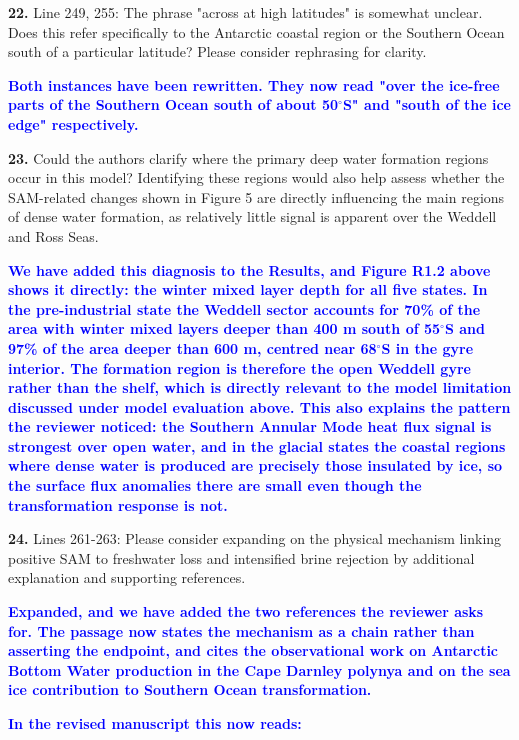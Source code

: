 \documentclass[pdflatex,sn-nature]{sn-jnl}
\begin{document}
\medskip
\noindent \textbf{22.} Line 249, 255: The phrase "across at high latitudes" is somewhat unclear. Does this refer specifically to the Antarctic coastal region or the Southern Ocean south of a particular latitude? Please consider rephrasing for clarity.
\medskip

\noindent\textcolor{blue}{\textbf{Both instances have been rewritten. They now read "over the ice-free parts of the Southern Ocean south of about 50$^\circ$S" and "south of the ice edge" respectively.}}


\medskip
\noindent \textbf{23.} Could the authors clarify where the primary deep water formation regions occur in this model? Identifying these regions would also help assess whether the SAM-related changes shown in Figure 5 are directly influencing the main regions of dense water formation, as relatively little signal is apparent over the Weddell and Ross Seas.
\medskip

\noindent\textcolor{blue}{\textbf{We have added this diagnosis to the Results, and Figure R1.2 above shows it directly: the winter mixed layer depth for all five states. In the pre-industrial state the Weddell sector accounts for 70\% of the area with winter mixed layers deeper than 400 m south of 55$^\circ$S and 97\% of the area deeper than 600 m, centred near 68$^\circ$S in the gyre interior. The formation region is therefore the open Weddell gyre rather than the shelf, which is directly relevant to the model limitation discussed under model evaluation above. This also explains the pattern the reviewer noticed: the Southern Annular Mode heat flux signal is strongest over open water, and in the glacial states the coastal regions where dense water is produced are precisely those insulated by ice, so the surface flux anomalies there are small even though the transformation response is not.}}


\medskip
\noindent \textbf{24.} Lines 261-263: Please consider expanding on the physical mechanism linking positive SAM to freshwater loss and intensified brine rejection by additional explanation and supporting references.
\medskip

\noindent\textcolor{blue}{\textbf{Expanded, and we have added the two references the reviewer asks for. The passage now states the mechanism as a chain rather than asserting the endpoint, and cites the observational work on Antarctic Bottom Water production in the Cape Darnley polynya and on the sea ice contribution to Southern Ocean transformation.}}


\noindent\textcolor{blue}{\textbf{In the revised manuscript this now reads:}}
\end{document}
